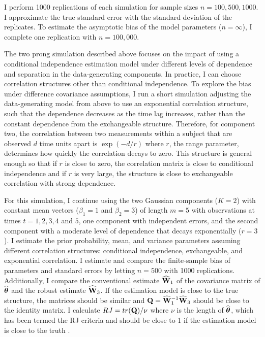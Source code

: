 I perform 1000 replications of each simulation for sample sizes $n=100, 500, 1000$. I approximate the true standard error with the standard deviation of the replicates. To estimate the asymptotic bias of the model parameters ($n=\infty$), I complete one replication with $n=100,000$.

The two prong simulation described above focuses on the impact of using a conditional independence estimation model under different levels of dependence and separation in the data-generating components. In practice, I can choose correlation structures other than conditional independence. To explore the bias under difference covariance assumptions, I run a short simulation adjusting the data-generating model from above to use an exponential correlation structure, such that the dependence decreases as the time lag increases, rather than the constant dependence from the exchangeable structure. Therefore, for component two, the correlation between two measurements within a subject that are observed $d$ time units apart is $\exp(-d/r)$ where $r$, the range parameter, determines how quickly the correlation decays to zero. This structure is general enough so that if $r$ is close to zero, the correlation matrix is close to conditional independence and if $r$ is very large, the structure is close to exchangeable correlation with strong dependence. 

For this simulation, I continue using the two Gaussian components ($K = 2$) with constant mean vectors ($\beta_{1}=1$ and $\beta_{2}=3$) of length $m=5$ with observations at times $t=1,2,3,4$ and $5$, one component with independent errors, and the second component with a moderate level of dependence that decays exponentially ($r=3$). I estimate the prior probability, mean, and variance parameters assuming different correlation structures: conditional independence, exchangeable, and exponential correlation. I estimate and compare the finite-sample bias of parameters and standard errors by letting $n=500$ with 1000 replications. Additionally, I compare the conventional estimate $\widehat{\mathbf W}_{1}$ of the covariance matrix of $\widehat{\boldsymbol \theta}$ and the robust estimate $\widehat{\mathbf W}_{3}$. If the estimation model is close to the true structure, the matrices should be similar and $\mathbf Q = \widehat{\mathbf W}_{1}^{-1}\widehat{\mathbf W}_{3}$ should be close to the identity matrix. I calculate $RJ=tr(\mathbf Q)/\nu$ where $\nu$ is the length of $\widehat{\boldsymbol\theta}$, which has been termed the RJ criteria and should be close to 1 if the estimation model is close to the truth \cite{shults2009,rotnitzky1990}.


